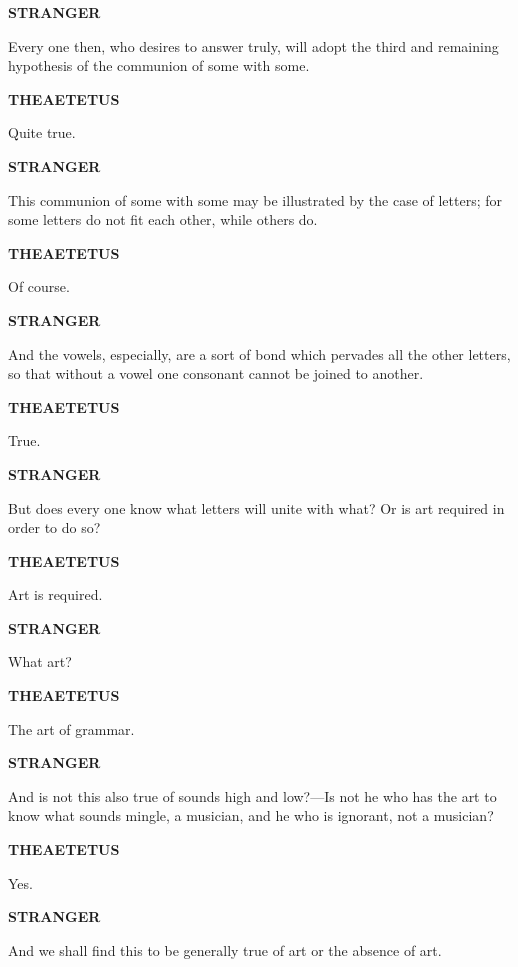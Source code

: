\documentclass[11pt,letter]{article}
\begin{document}
\par \textbf{STRANGER}
\par   Every one then, who desires to answer truly, will adopt the third and remaining hypothesis of the communion of some with some.

\par \textbf{THEAETETUS}
\par   Quite true.

\par \textbf{STRANGER}
\par   This communion of some with some may be illustrated by the case of letters; for some letters do not fit each other, while others do.

\par \textbf{THEAETETUS}
\par   Of course.

\par \textbf{STRANGER}
\par   And the vowels, especially, are a sort of bond which pervades all the other letters, so that without a vowel one consonant cannot be joined to another.

\par \textbf{THEAETETUS}
\par   True.

\par \textbf{STRANGER}
\par   But does every one know what letters will unite with what? Or is art required in order to do so?

\par \textbf{THEAETETUS}
\par   Art is required.

\par \textbf{STRANGER}
\par   What art?

\par \textbf{THEAETETUS}
\par   The art of grammar.

\par \textbf{STRANGER}
\par   And is not this also true of sounds high and low?—Is not he who has the art to know what sounds mingle, a musician, and he who is ignorant, not a musician?

\par \textbf{THEAETETUS}
\par   Yes.

\par \textbf{STRANGER}
\par   And we shall find this to be generally true of art or the absence of art.
\end{document}
